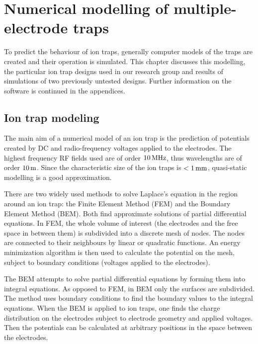 \setcounter{chapter}{1} %
\chapter{Numerical
 modelling of multiple-electrode traps}
\label{chapter:simulation}

To predict the behaviour of ion traps, generally computer models of the traps are created and their operation is simulated. This chapter discusses this modelling, the particular ion trap designs used in our research group and results of simulations of two previously untested designs. 
Further information on the software is continued in the appendices.


\section{Ion trap modeling}

The main aim of a numerical  model of an ion trap is the prediction of potentials created by DC and radio-frequency voltages applied to the electrodes. The highest frequency RF fields used are of order $10\,\mbox{MHz}$, thus wavelengths are of order $10\,\mbox{m}$. Since the characteristic size of the ion traps is $<1\,\mbox{mm}$, quasi-static modelling is a good approximation. 

There are two widely used methods to solve Laplace's equation in the region around an ion trap: the Finite Element Method (FEM) and the Boundary Element Method (BEM). Both find approximate solutions of partial differential equations. In FEM, the whole volume of interest (the electrodes and the free space in between them) is subdivided into a discrete mesh of nodes. The nodes are connected to their neighbours by linear or quadratic functions. An energy minimization algorithm is then used to calculate the potential on the mesh, subject to boundary conditions (voltages applied to the electrodes). 

The BEM attempts to solve partial differential equations by  forming them into integral equations. As opposed to FEM, in BEM only the surfaces are subdivided. The method uses boundary conditions to find the boundary values to the integral equations. When the BEM is applied to ion traps, one finds the charge distribution on the electrodes subject to electrode geometry and applied voltages. Then the potentials can be calculated at arbitrary positions in the space between the electrodes. 


